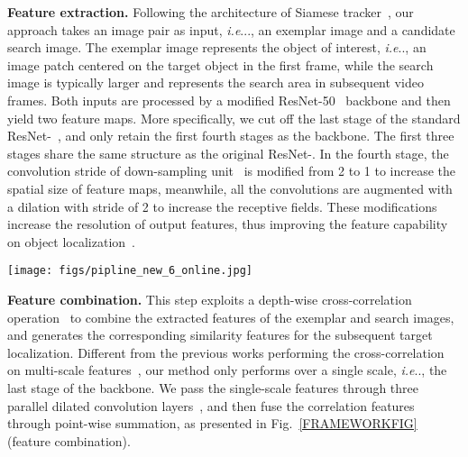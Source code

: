 \documentclass[runningheads]{llncs}
\makeatletter
\DeclareRobustCommand\onedot{\futurelet\@let@token\@onedot}
\def\@onedot{\ifx\@let@token.\else.\null\fi\xspace}
\def\ie{\emph{i.e}\onedot} \def\Ie{\emph{I.e}\onedot}
\makeatother
\begin{document}
\textbf{Feature extraction.} Following the architecture of Siamese tracker~\cite{siamFC}, our approach takes an image pair as input, \ie., an exemplar image and a candidate search image. The exemplar image represents the object of interest, \ie, an image patch centered on the target object in the first frame, while the search image is typically larger and represents the search area in subsequent video frames. Both inputs are processed by a modified ResNet-50~\cite{ResNet} backbone and then yield two feature maps. More specifically, we cut off the last stage of the standard ResNet-~\cite{ResNet}, and only retain the first fourth stages as the backbone. The first three stages share the same structure as the original ResNet-. In the fourth stage, the convolution stride of down-sampling unit~\cite{ResNet} is modified from 2 to 1 to increase the spatial size of feature maps, meanwhile, all the  convolutions are augmented with a dilation with stride of 2 to increase the receptive fields.
These modifications increase the resolution of output features, thus improving the feature capability on object localization~\cite{HoleConv,SiamRPN++}.



\begin{figure*}[!t]
\begin{center}
		\vspace{-1.5em}
		


		\texttt{[image: figs/pipline\_new\_6\_online.jpg]}
		\vspace{-2.8em}
		
		\caption{
			Overview of the proposed tracking framework, consisting of an offline anchor-free part (top) and an online model update part (bottom). The offline tracking includes feature extraction, feature combination and target localization with object-aware anchor-free networks, as elaborated in Sec. \ref{Sec4.1}. The plug-in online update network models the appearance changes of target objects, as detailed in Sec. \ref{Sec4.2}.
			 indicates a  convolution layer with dilation stride of  along the -axis and  along the -axis.
		}
		
		\label{FRAMEWORKFIG}
	\end{center}
	
	\vspace{-3.1em}
\end{figure*}

\textbf{Feature combination.}
This step exploits a depth-wise cross-correlation operation~\cite{SiamRPN++} to combine the extracted features of the exemplar and search images, and generates the corresponding similarity features for the subsequent target localization. Different from the previous works performing the cross-correlation on multi-scale features~\cite{SiamRPN++}, our method only performs over a single scale, \ie, the last stage of the backbone. We pass the single-scale features through three parallel dilated convolution layers~\cite{Dilated}, and then fuse the correlation features through point-wise summation, as presented in Fig.~\ref{FRAMEWORKFIG} (feature combination). 
\end{document}
